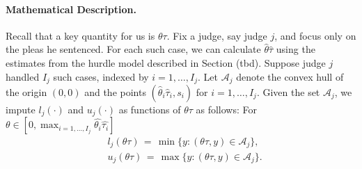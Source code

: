 \documentclass[11pt, oneside]{article}   	%
\theoremstyle{ModifiedStyle}
\begin{document}
    \paragraph{Mathematical Description.} Recall that a key quantity for us is $\theta\tau$. Fix a judge, say judge $j$, and focus only on the pleas he sentenced. For each such case, we can calculate $\hat{\theta}\hat{\tau}$ using the estimates from the hurdle model described in Section (tbd). Suppose judge $j$ handled $I_j$ such cases, indexed by $i=1,\ldots,I_j$. Let $\mathcal{A}_j$ denote the convex hull of the origin $(0,0)$ and the points $(\hat{\theta}_i\hat{\tau}_i,s_i)$ for $i=1,\ldots,I_j$. Given the set $\mathcal{A}_j$, we impute $l_j(\cdot)$ and $u_j(\cdot)$ as functions of $\theta\tau$ as follows: For $\theta \in [0,\max_{i=1,...,I_j} \hat{\theta_i}\hat{\tau_i}]$
		\begin{align*}
			&l_j(\theta\tau) \,=\, \min\{y:(\theta\tau,y)\in\mathcal{A}_j \}, \\
			&u_j(\theta\tau) \,=\, \max\{y:(\theta\tau,y)\in\mathcal{A}_j \}.
		\end{align*}

\end{document}
